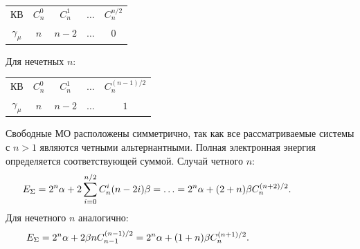 \begin{tabular}{ |c|c|c|c|c| }
 КВ & $C_n^0$ & $C_n^1$ & $\ldots$ & $C_n^{n/2}$ \\ 
 $\gamma_{\mu}$ & $n$ & $n-2$ & $\ldots$ & $0$ \\  
\end{tabular}
\par
\vspace{-\parskip}
\vspace{3mm}
Для нечетных $n$:
\par
\vspace{-\parskip}
\vspace{2mm}
\hspace{8mm}
\begin{tabular}{ |c|c|c|c|c| }
 КВ & $C_n^0$ & $C_n^1$ & $\ldots$ & $C_n^{(n-1)/2}$ \\ 
 $\gamma_{\mu}$ & $n$ & $n-2$ & $\ldots$ & $1$ \\  
\end{tabular}\par
\vspace{-\parskip}
\vspace{2mm}
Свободные МО расположены симметрично, так как все рассматриваемые системы с $n > 1$ являются четными альтернантными. Полная электронная энергия определяется соответствующей суммой. Случай четного $n$:
\begin{equation*}
\begin{aligned}
& E_{\Sigma}=2^n \alpha+2\sum_{i=0}^{n/2} C_n^i (n-2i)\beta = \ldots = 2^n \alpha + (2+n)\beta C_n^{(n+2)/2}.\hspace{13mm}
\end{aligned}
\end{equation*}
Для нечетного $n$ аналогично:
\begin{equation*}
\begin{aligned}
& E_{\Sigma}= 2^n \alpha + 2\beta n C_{n-1}^{(n-1)/2} = 2^n \alpha + (1+n) \beta C_{n}^{(n+1)/2}.\hspace{27mm}
\end{aligned}
\end{equation*}
\par
\vspace{-\parskip}
